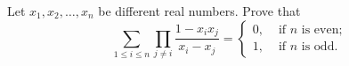 Let $x_1, x_2, \dots, x_n$ be different real numbers. Prove that
\[\sum_{1 \leqslant i \leqslant n} \prod_{j \neq i} \frac{1-x_{i} x_{j}}{x_{i}-x_{j}}=\left\{\begin{array}{ll}
0, & \text { if } n \text { is even; } \\
1, & \text { if } n \text { is odd. }
\end{array}\right.\]